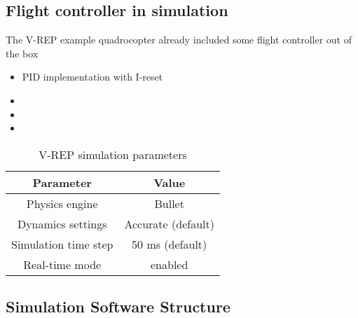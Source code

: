 \subsection{Flight controller in simulation}

The V-REP example quadrocopter already included some flight controller out of the box

\begin{itemize}
\item{PID implementation with I-reset}
\item{}
\item{}
\item{}
\end{itemize}



\begin{table}[h]
	\centering
	\begin{tabular}{|c|c|}
    		\hline
		Parameter & Value \\
		\hline
    		Physics engine & Bullet\\
    		\hline
    		Dynamics settings & Accurate (default) \\
    		\hline
    		Simulation time step & 50 ms (default) \\
    		\hline
    		Real-time mode & enabled \\
    		\hline
	\end{tabular}
    	\caption{V-REP simulation parameters}
      	\label{tab:simSettings}
\end{table}

\subsection{Simulation Software Structure}

